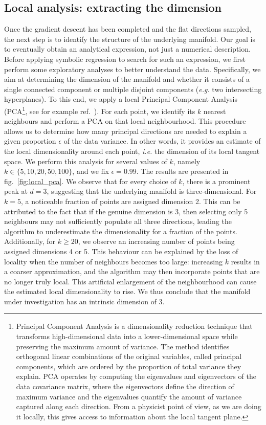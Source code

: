 \documentclass[11pt,a4paper]{article}
\begin{document}
	\subsection{Local analysis: extracting the dimension}
	Once the gradient descent has been completed and the flat directions sampled, the next step is to identify the structure of the underlying manifold. Our goal is to eventually obtain an analytical expression, not just a numerical description. Before applying symbolic regression to search for such an expression, we first perform some exploratory analyses to better understand the data. Specifically, we aim at determining the dimension of the manifold and whether it consists of a single connected component or multiple disjoint components (\textit{e.g.} two intersecting hyperplanes). To this end, we apply a local Principal Component Analysis (PCA\footnote{Principal Component Analysis is a dimensionality reduction technique that transforms high-dimensional data into a lower-dimensional space while preserving the maximum amount of variance. The method identifies orthogonal linear combinations of the original variables, called principal components, which are ordered by the proportion of total variance they explain. PCA operates by computing the eigenvalues and eigenvectors of the data covariance matrix, where the eigenvectors define the direction of maximum variance and the eigenvalues quantify the amount of variance captured along each direction. From a physicist point of view, as we are doing it locally, this gives access to information about the local tangent plane.}, see for example ref.~\cite{scikit-learn}). For each point, we identify its $k$ nearest neighbours and perform a PCA on that local neighbourhood. This procedure allows us to determine how many principal directions are needed to explain a given proportion $\epsilon$ of the data variance. In other words, it provides an estimate of the local dimensionality around each point, \textit{i.e.} the dimension of its local tangent space. We perform this analysis for several values of $k$, namely $k \in \{5, 10, 20, 50, 100\}$, and we fix $\epsilon = 0.99$. The results are presented in fig.~\ref{fig:local_pca}. We observe that for every choice of $k$, there is a prominent peak at $d = 3$, suggesting that the underlying manifold is three-dimensional. For $k = 5$, a noticeable fraction of points are assigned dimension 2. This can be attributed to the fact that if the genuine dimension is 3, then selecting only 5 neighbours may not sufficiently populate all three directions, leading the algorithm to underestimate the dimensionality for a fraction of the points. Additionally, for $k \geq 20$, we observe an increasing number of points being assigned dimensions 4 or 5. This behaviour can be explained by the loss of locality when the number of neighbours becomes too large: increasing $k$ results in a coarser approximation, and the algorithm may then incorporate points that are no longer truly local. This artificial enlargement of the neighbourhood can cause the estimated local dimensionality to rise. We thus conclude that the manifold under investigation has an intrinsic dimension of 3.
\end{document}
